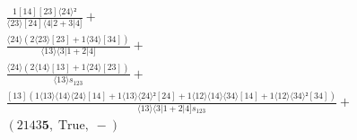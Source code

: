 \documentclass[varwidth, border=5pt]{standalone}
\begin{document}
\begin{my}
$\begin{gathered}
\scriptscriptstyle\frac{1[14][23]⟨24⟩²}{⟨23⟩[24]⟨4|2+3|4]} +\\
\scriptscriptstyle\frac{⟨24⟩(2⟨23⟩[23]+1⟨34⟩[34])}{⟨13⟩⟨3|1+2|4]} +\\
\scriptscriptstyle\frac{⟨24⟩(2⟨14⟩[13]+1⟨24⟩[23])}{⟨13⟩s_{123}} +\\
\scriptscriptstyle\frac{[13](1⟨13⟩⟨14⟩⟨24⟩[14]+1⟨13⟩⟨24⟩²[24]+1⟨12⟩⟨14⟩⟨34⟩[14]+1⟨12⟩⟨34⟩²[34])}{⟨13⟩⟨3|1+2|4]s_{123}} +\\
\scriptscriptstyle(2143𝟓,\;\text{True},\;-) \phantom{+}
\end{gathered}$
\end{my}
\end{document}
